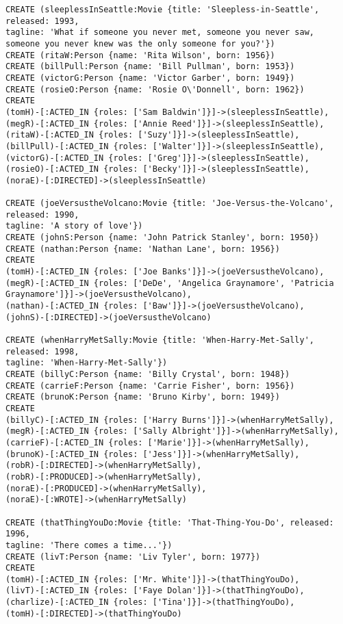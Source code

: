 \begin{lstlisting}
CREATE (sleeplessInSeattle:Movie {title: 'Sleepless-in-Seattle', released: 1993,
tagline: 'What if someone you never met, someone you never saw, someone you never knew was the only someone for you?'})
CREATE (ritaW:Person {name: 'Rita Wilson', born: 1956})
CREATE (billPull:Person {name: 'Bill Pullman', born: 1953})
CREATE (victorG:Person {name: 'Victor Garber', born: 1949})
CREATE (rosieO:Person {name: 'Rosie O\'Donnell', born: 1962})
CREATE
(tomH)-[:ACTED_IN {roles: ['Sam Baldwin']}]->(sleeplessInSeattle),
(megR)-[:ACTED_IN {roles: ['Annie Reed']}]->(sleeplessInSeattle),
(ritaW)-[:ACTED_IN {roles: ['Suzy']}]->(sleeplessInSeattle),
(billPull)-[:ACTED_IN {roles: ['Walter']}]->(sleeplessInSeattle),
(victorG)-[:ACTED_IN {roles: ['Greg']}]->(sleeplessInSeattle),
(rosieO)-[:ACTED_IN {roles: ['Becky']}]->(sleeplessInSeattle),
(noraE)-[:DIRECTED]->(sleeplessInSeattle)

CREATE (joeVersustheVolcano:Movie {title: 'Joe-Versus-the-Volcano', released: 1990,
tagline: 'A story of love'})
CREATE (johnS:Person {name: 'John Patrick Stanley', born: 1950})
CREATE (nathan:Person {name: 'Nathan Lane', born: 1956})
CREATE
(tomH)-[:ACTED_IN {roles: ['Joe Banks']}]->(joeVersustheVolcano),
(megR)-[:ACTED_IN {roles: ['DeDe', 'Angelica Graynamore', 'Patricia Graynamore']}]->(joeVersustheVolcano),
(nathan)-[:ACTED_IN {roles: ['Baw']}]->(joeVersustheVolcano),
(johnS)-[:DIRECTED]->(joeVersustheVolcano)

CREATE (whenHarryMetSally:Movie {title: 'When-Harry-Met-Sally', released: 1998,
tagline: 'When-Harry-Met-Sally'})
CREATE (billyC:Person {name: 'Billy Crystal', born: 1948})
CREATE (carrieF:Person {name: 'Carrie Fisher', born: 1956})
CREATE (brunoK:Person {name: 'Bruno Kirby', born: 1949})
CREATE
(billyC)-[:ACTED_IN {roles: ['Harry Burns']}]->(whenHarryMetSally),
(megR)-[:ACTED_IN {roles: ['Sally Albright']}]->(whenHarryMetSally),
(carrieF)-[:ACTED_IN {roles: ['Marie']}]->(whenHarryMetSally),
(brunoK)-[:ACTED_IN {roles: ['Jess']}]->(whenHarryMetSally),
(robR)-[:DIRECTED]->(whenHarryMetSally),
(robR)-[:PRODUCED]->(whenHarryMetSally),
(noraE)-[:PRODUCED]->(whenHarryMetSally),
(noraE)-[:WROTE]->(whenHarryMetSally)

CREATE (thatThingYouDo:Movie {title: 'That-Thing-You-Do', released: 1996,
tagline: 'There comes a time...'})
CREATE (livT:Person {name: 'Liv Tyler', born: 1977})
CREATE
(tomH)-[:ACTED_IN {roles: ['Mr. White']}]->(thatThingYouDo),
(livT)-[:ACTED_IN {roles: ['Faye Dolan']}]->(thatThingYouDo),
(charlize)-[:ACTED_IN {roles: ['Tina']}]->(thatThingYouDo),
(tomH)-[:DIRECTED]->(thatThingYouDo)


\end{lstlisting}
